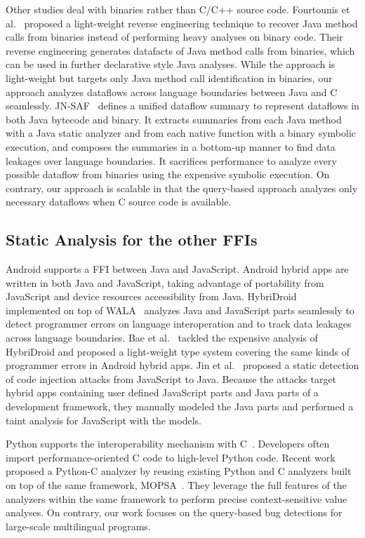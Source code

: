 Other studies deal with binaries rather than C/C++ source code.  Fourtounis et
al.~\cite{scanning} proposed a light-weight reverse engineering technique to
recover Java method calls from binaries instead of performing heavy analyses on
binary code.  Their reverse engineering generates datafacts of Java method
calls from binaries, which can be used in further declarative style Java
analyses. While the approach is light-weight but targets only Java method call
identification in binaries, our approach analyzes dataflows across language
boundaries between Java and C seamlessly.  JN-SAF~\cite{JN-SAF} defines a
unified dataflow summary to represent dataflows in both Java bytecode and
binary.  It extracts summaries from each Java method with a Java static
analyzer and from each native function with a binary symbolic execution, and
composes the summaries in a bottom-up manner to find data leakages over
language boundaries.  It sacrifices performance to analyze every possible
dataflow from binaries using the expensive symbolic execution. On contrary, our
approach is scalable in that the query-based approach analyzes only necessary
dataflows when C source code is available.


\subsection{Static Analysis for the other FFIs}
Android supports a FFI between Java and JavaScript.  Android hybrid apps are
written in both Java and JavaScript, taking advantage of portability from
JavaScript and device resources accessibility from Java.
HybriDroid~\cite{hybridroid} implemented on top of WALA~\cite{WALA} analyzes
Java and JavaScript parts seamlessly to detect programmer errors on language
interoperation and to track data leakages across language boundaries.  Bae et
al.~\cite{BaeICSE19} tackled the expensive analysis of HybriDroid and proposed
a light-weight type system covering the same kinds of programmer errors in
Android hybrid apps.  Jin et al.~\cite{jin2014code} proposed a static detection
of code injection attacks from JavaScript to Java.  Because the attacks target
hybrid apps containing user defined JavaScript parts and Java parts of a
development framework, they manually modeled the Java parts and performed a
taint analysis for JavaScript with the models.


Python supports the interoperability mechanism with C~\cite{PythonC}.
Developers often import performance-oriented C code to high-level Python code.
Recent work~\cite{sas2021} proposed a Python-C analyzer by reusing existing
Python and C analyzers built on top of the same framework, MOPSA~\cite{Mopsa}.
They leverage the full features of the analyzers within the same framework to
perform precise context-sensitive value analyses. On contrary, our work focuses
on the query-based bug detections for large-scale multilingual programs. 


